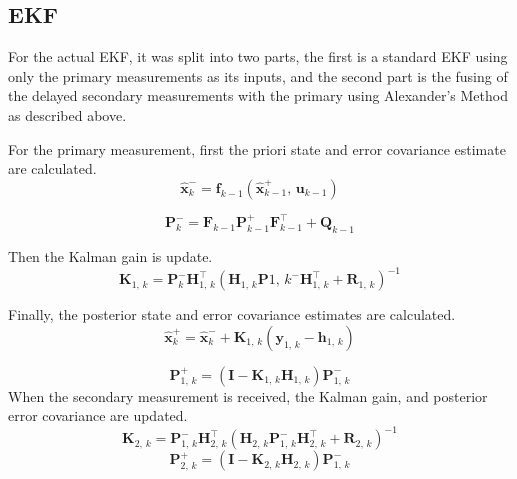 \subsection{EKF}
	For the actual EKF, it was split into two parts, the first is a standard EKF using only the primary measurements as its inputs, and the second part is the fusing of the delayed secondary measurements with the primary using Alexander's Method as described above.\par
	For the primary measurement, first the priori state and error covariance estimate are calculated.
	\begin{equation}
	\label{eq:x-}
		\hat{\boldsymbol{x}}_{k}^{-}=\boldsymbol{f}_{k-1}\left(\hat{\boldsymbol{x}}^{+}_{k-1},\,\boldsymbol{u}_{k-1}\right)
	\end{equation}
	
	\begin{equation}
	\label{eq:P+}
		\boldsymbol{P}_{k}^{-} = \boldsymbol{F}_{k-1}\boldsymbol{P}_{k-1}^{+}\boldsymbol{F}_{k-1}^{\top} + \boldsymbol{Q}_{k-1}
	\end{equation}
	
	Then the Kalman gain is update.
	\begin{equation}
	\label{eq:K}
		\boldsymbol{K}_{1,\,k} = \boldsymbol{P}_{k}^{-}\boldsymbol{H}_{1,\,k}^{\top}\left(\boldsymbol{H}_{1,\,k}\boldsymbol{P}{1,\,k}^{-}\boldsymbol{H}_{1,\,k}^{\top} + \boldsymbol{R}_{1,\,k} \right)^{-1}
	\end{equation}
	
	Finally, the posterior state and error covariance estimates are calculated.
	\begin{equation}
	\label{eq:x+}
		\hat{\boldsymbol{x}}_{k}^{+}=\hat{\boldsymbol{x}}_{k}^{-} + \boldsymbol{K}_{1,\,k}\left(\boldsymbol{y}_{1,\,k}- \boldsymbol{h}_{1,\,k}\right)
	\end{equation}
	
	\begin{equation}
	\label{eq:p+}
		\boldsymbol{P}_{1,\,k}^{+} = \left(\boldsymbol{I} - \boldsymbol{K}_{1,\,k}\boldsymbol{H}_{1,\,k}\right)\boldsymbol{P}_{1,\,k}^{-}
	\end{equation}
	When the secondary measurement is received, the Kalman gain, and posterior error covariance are updated.
	\begin{equation}
	\label{eq:K2}
		\boldsymbol{K}_{2,\,k} = \boldsymbol{P}_{1,\,k}^{-}\boldsymbol{H}_{2,\,k}^{\top}\left(\boldsymbol{H}_{2,\,k}\boldsymbol{P}_{1,\,k}^{-}\boldsymbol{H}_{2,\,k}^{\top} + \boldsymbol{R}_{2,\,k} \right)^{-1}
	\end{equation}
	\begin{equation}
	\label{eq:p2+}
		\boldsymbol{P}_{2,\,k}^{+} = \left(\boldsymbol{I} - \boldsymbol{K}_{2,\,k}\boldsymbol{H}_{2,\,k}\right)\boldsymbol{P}_{1,\,k}^{-}
	\end{equation}
	
